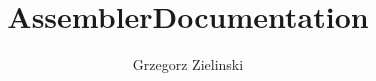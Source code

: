 \newcommand{\programname}{Assembler\space}

\usepackage{hyperref}
\usepackage{listings}

\title{\programname Documentation}
\author{Grzegorz Zielinski}

\lstset{
basicstyle=\small\ttfamily,
columns=flexible,
breaklines=true
}
